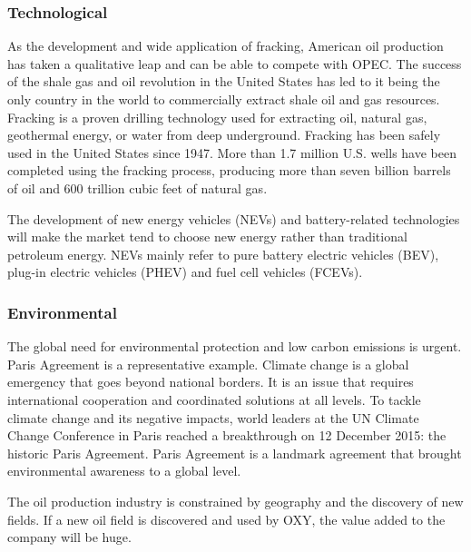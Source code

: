 \documentclass[
	a4paper, %
	12pt,%
]{CSSullivanBusinessReport}
\begin{document}
\begin{fullwidth}
\subsubsection{Technological}
As the development and wide application of fracking, American oil production has taken a qualitative leap and can be able to compete with OPEC. The success of the shale gas and oil revolution in the United States has led to it being the only country in the world to commercially extract shale oil and gas resources. Fracking is a proven drilling technology used for extracting oil, natural gas, geothermal energy, or water from deep underground. Fracking has been safely used in the United States since 1947. More than 1.7 million U.S. wells have been completed using the fracking process, producing more than seven billion barrels of oil and 600 trillion cubic feet of natural gas.
\par
The development of new energy vehicles (NEVs) and battery-related technologies will make the market tend to choose new energy rather than traditional petroleum energy. NEVs mainly refer to pure battery electric vehicles (BEV), plug-in electric vehicles (PHEV) and fuel cell vehicles (FCEVs).
\subsubsection{Environmental}
The global need for environmental protection and low carbon emissions is urgent. Paris Agreement is a representative example. Climate change is a global emergency that goes beyond national borders. It is an issue that requires international cooperation and coordinated solutions at all levels. To tackle climate change and its negative impacts, world leaders at the UN Climate Change Conference in Paris reached a breakthrough on 12 December 2015: the historic Paris Agreement. Paris Agreement is a landmark agreement that brought environmental awareness to a global level.
\par
The oil production industry is constrained by geography and the discovery of new fields. If a new oil field is discovered and used by OXY, the value added to the company will be huge.

\end{fullwidth}
\end{document}
